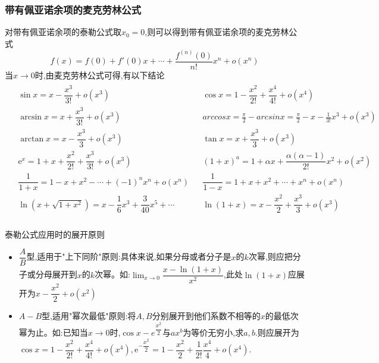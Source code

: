 \documentclass[9pt a4paper, oneside, UTF8]{ctexbook}
\begin{document}
\begin{sloppypar}
    \subsubsection{带有佩亚诺余项的麦克劳林公式}
    对带有佩亚诺余项的泰勒公式取$x_0=0$,则可以得到带有佩亚诺余项的麦克劳林公式
    $$
    f(x)=f(0)+f'(0)x+\cdots+\dfrac{f^{(n)}(0)}{n!}x^{n}+o(x^{n})
    $$
    当$x\to 0$时,由麦克劳林公式可得,有以下结论
    \begin{align*}
        \boxed{\begin{aligned}
                    & \sin x =x-\dfrac{x^3}{3!}+o(x^3)                                &  & \cos x =1-\dfrac{x^2}{2!}+\dfrac{x^4}{4!}+o(x^4)                  \\
                    & \arcsin x =x+\dfrac{x^3}{3!}+o(x^3)                             &  &                              arccosx=\frac\pi2-arcsinx=\frac\pi2-x-\frac1{3!}x^3+o(x^3)       \\
                    & \arctan x =x-\dfrac{x^{3}}{3}+o(x^{3})                          &  & \tan x =x+\dfrac{x^3}3+o(x^3)              \\
                    & \mathrm{e}^{x} =1+x+\dfrac{x^{2}}{2!}+\dfrac{x^{3}}{3!}+o(x^{3}) &  & (1+x)^{a} =1+\alpha x+\dfrac{\alpha(\alpha-1)}{2!}x^{2}+o(x^{2}) \\
                    & \dfrac{1}{1+x}=1-x+x^{2}-\cdots+(-1)^{n}x^{n}+o(x^{n})          &  &       \dfrac{1}{1-x}=1+x+x^{2}+\cdots+x^{n}+o(x^{n}) \\
                    & \ln (x+\sqrt{1+x^{2}})=x-\dfrac{1}{6}x^{3}+\dfrac{3}{40}x^{5}+\cdots  & & \ln(1+x) =x-\dfrac{x^{2}}{2}+\dfrac{x^{3}}{3}+o(x^{3}) \\
                \end{aligned}}
    \end{align*}
    \begin{criterion}{泰勒公式应用时的展开原则}{}
        \begin{itemize}
            \item $\dfrac{A}{B}$型,适用于"上下同阶"原则:具体来说,如果分母或者分子是$x$的$k$次幂,则应把分子或分母展开到$x$的$k$次幂。如:$\lim_{x\to0}\dfrac{x-\ln(1+x)}{x^{2}}$,此处$\ln(1+x)$应展开为$x-\dfrac{x^2}{2}+o(x^2)$
            \item $A-B$型,适用"幂次最低"原则:将$A,B$分别展开到他们系数不相等的$x$的最低次幂为止。如:已知当$x\to0$时,$\cos x-e^{\dfrac{x^2}2}$与$ax^b$为等价无穷小,求$a,b$.则应展开为$\cos x=1-\dfrac{x^2}{2!}+\dfrac{x^4}{4!}+o(x^4),\mathrm{e}^{-\dfrac{x^2}{2}}=1-\dfrac{x^2}{2}+\dfrac{1}{2!}\dfrac{x^4}{4}+o(x^4).$

\end{itemize}
\end{criterion}
\end{sloppypar}
\end{document}
